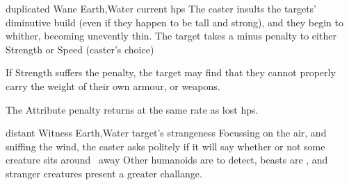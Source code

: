   {duplicated}%
  {Wane}%
  {Earth,Water}%
  {current \glspl{hp}}%
  {The caster insults the targets' diminutive build (even if they happen to be tall and strong), and they begin to whither, becoming unevently thin.
    The target takes a minus  penalty to either Strength or Speed (caster's choice)}%
  {If Strength suffers the penalty, the target may find that they cannot properly carry the weight of their own armour, or weapons.

    The Attribute penalty returns at the same rate as lost \glspl{hp}.}

  {distant}%
  {Witness}%
  {Earth,Water}%
  {target's strangeness}%
  {Focussing on the air, and sniffing the wind, the caster asks politely if it will say whether or not some creature sits around \spellRange\ away}%
  {Other humanoids are \tn[7] to detect, beasts are \tn[9], and stranger creatures present a greater challange.}
